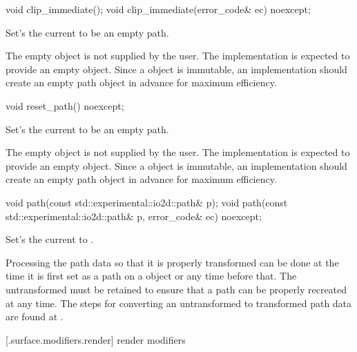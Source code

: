 \begin{itemdecl}
void clip_immediate();
void clip_immediate(error_code& ec) noexcept;
\end{itemdecl}
\begin{itemdescr}
	\pnum
	\effects
	Set's the current  to be an empty path.
	
	\pnum
	\realnotes
	The empty  object is not supplied by the user. The implementation is expected to provide an empty  object. Since a  object is immutable, an implementation should create an empty path object in advance for maximum efficiency.
\end{itemdescr}

\begin{itemdecl}
void reset_path() noexcept;
\end{itemdecl}
\begin{itemdescr}
	\pnum
	\effects
	Set's the current  to be an empty path.
	
	\pnum
	\realnotes
	The empty  object is not supplied by the user. The implementation is expected to provide an empty  object. Since a  object is immutable, an implementation should create an empty path object in advance for maximum efficiency.
\end{itemdescr}

\begin{itemdecl}
void path(const std::experimental::io2d::path& p);
void path(const std::experimental::io2d::path& p, error_code& ec) noexcept;
\end{itemdecl}
\begin{itemdescr}
	\pnum
	\effects
	Set's the current  to .
	
	\pnum
	\remarks
	Processing the path data so that it is properly transformed can be done at the time it is first set as a path on a  object or any time before that. The untransformed  must be retained to ensure that a path can be properly recreated at any time. The steps for converting an untransformed  to transformed path data are found at .
\end{itemdescr}

 [\iotwod.surface.modifiers.render] { render modifiers}

